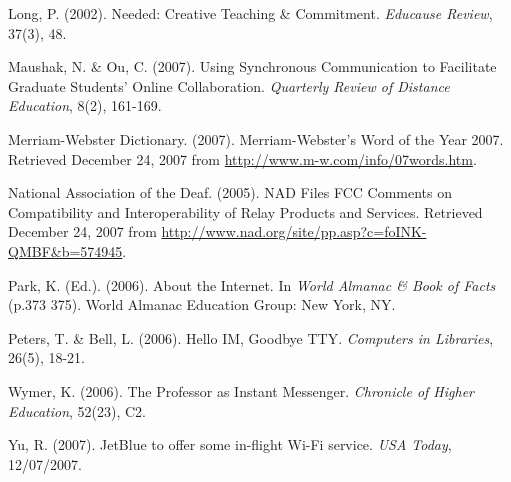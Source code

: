 \documentclass[11.5pt]{sig-alternate} %
\begin{document}
Long, P. (2002). Needed: Creative Teaching \& Commitment. \textit{Educause Review}, 37(3), 48. 

Maushak, N. \& Ou, C. (2007). Using Synchronous Communication to Facilitate Graduate Students’ Online Collaboration. \textit{Quarterly Review of Distance Education}, 8(2), 161-169. 

Merriam-Webster Dictionary. (2007). Merriam-Webster's Word of the Year 2007. Retrieved December 24, 2007 from \url{http://www.m-w.com/info/07words.htm}. 

National Association of the Deaf. (2005). NAD Files FCC Comments on Compatibility and Interoperability of Relay Products and Services. Retrieved December 24, 2007 from \url{http://www.nad.org/site/pp.asp?c=foINK-QMBF\&b=574945}. 

Park, K. (Ed.). (2006). About the Internet. In \textit{World Almanac \& Book of Facts} (p.373 375). World Almanac Education Group: New York, NY. 

Peters, T. \& Bell, L. (2006). Hello IM, Goodbye TTY. \textit{Computers in Libraries}, 26(5), 18-21. 

Wymer, K. (2006). The Professor as Instant Messenger. \textit{Chronicle of Higher Education}, 52(23), C2. 

Yu, R. (2007). JetBlue to offer some in-flight Wi-Fi service. \textit{USA Today}, 12/07/2007. 
\end{document}
